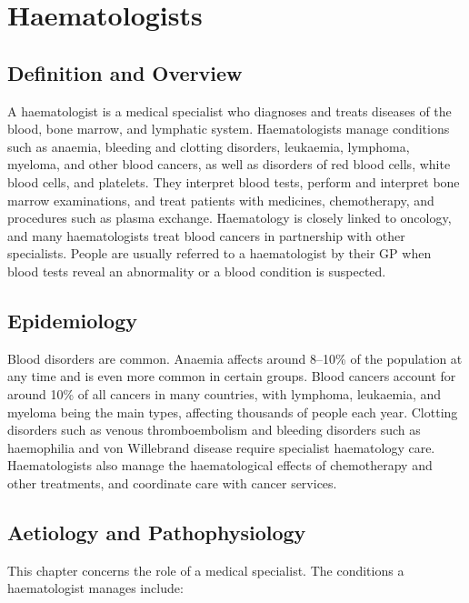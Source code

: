 \chapter{Haematologists}

\section*{Definition and Overview}
A haematologist is a medical specialist who diagnoses and treats diseases of the blood, bone marrow, and lymphatic system. Haematologists manage conditions such as anaemia, bleeding and clotting disorders, leukaemia, lymphoma, myeloma, and other blood cancers, as well as disorders of red blood cells, white blood cells, and platelets. They interpret blood tests, perform and interpret bone marrow examinations, and treat patients with medicines, chemotherapy, and procedures such as plasma exchange. Haematology is closely linked to oncology, and many haematologists treat blood cancers in partnership with other specialists. People are usually referred to a haematologist by their GP when blood tests reveal an abnormality or a blood condition is suspected.

\section*{Epidemiology}
Blood disorders are common. Anaemia affects around 8--10\% of the population at any time and is even more common in certain groups. Blood cancers account for around 10\% of all cancers in many countries, with lymphoma, leukaemia, and myeloma being the main types, affecting thousands of people each year. Clotting disorders such as venous thromboembolism and bleeding disorders such as haemophilia and von Willebrand disease require specialist haematology care. Haematologists also manage the haematological effects of chemotherapy and other treatments, and coordinate care with cancer services.

\section*{Aetiology and Pathophysiology}
This chapter concerns the role of a medical specialist. The conditions a haematologist manages include:

